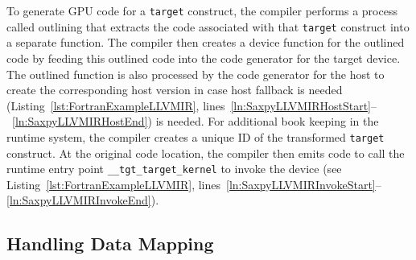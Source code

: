 \documentclass[acmtog,natbib=false]{acmart}
\newcommand{\code}[1]{\texttt{#1}\xspace}
\begin{document}
To generate GPU code for a \code{target} construct, the compiler performs a process called outlining that extracts the code associated with that \code{target} construct into a separate function.
The compiler then creates a device function for the outlined code by feeding this outlined code into the code generator for the target device. 
The outlined function is also processed by the code generator for the host to create the corresponding host version in case host fallback is needed (Listing~\ref{lst:FortranExampleLLVMIR}, lines~\ref{ln:SaxpyLLVMIRHostStart}--~\ref{ln:SaxpyLLVMIRHostEnd}) is needed.
For additional book keeping in the runtime system, the compiler creates a unique ID of the transformed \code{target} construct.
At the original code location, the compiler then emits code to call the runtime entry point \code{\_\_tgt\_target\_kernel} to invoke the device (see Listing~\ref{lst:FortranExampleLLVMIR}, lines~\ref{ln:SaxpyLLVMIRInvokeStart}--\ref{ln:SaxpyLLVMIRInvokeEnd}).




\subsection{Handling Data Mapping}
\label{sec:HandlingDataMapping}
\end{document}
